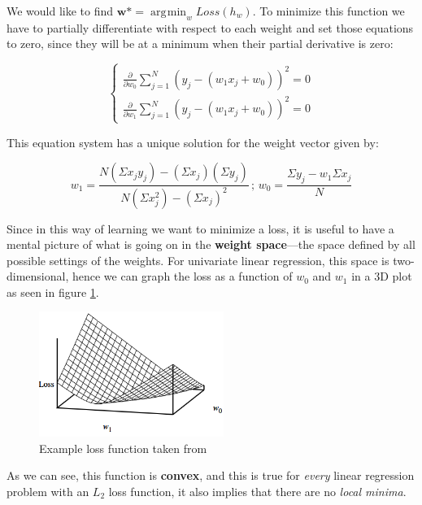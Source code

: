 \documentclass[10pt]{article}
\DeclareMathOperator*{\argmin}{\arg\!\min}
\begin{document}
We would like to find $\textbf{w*} = \argmin_{w} Loss(h_{w})$. To minimize this function we have to partially differentiate with respect to each weight and set those equations to zero, since they will be at a minimum when their partial derivative is zero: \par
\begin{equation*}
    \begin{cases}
        \frac{\partial}{\partial w_{0}} \sum_{j=1}^{N}(y_{j} - (w_{1}x_{j} + w_{0}))^{2} = 0 \\
        \frac{\partial}{\partial w_{1}} \sum_{j=1}^{N}(y_{j} - (w_{1}x_{j} + w_{0}))^{2} = 0
    \end{cases} 
\end{equation*}

This equation system has a unique solution for the weight vector given by: \par
\begin{equation*}
    w_{1} = \frac{N(\Sigma x_{j}y_{j}) - (\Sigma x_{j})(\Sigma y_{j})}{N(\Sigma x_{j}^{2}) - (\Sigma x_{j})^2} \,;\, w_{0} = \frac{\Sigma y_{j} - w_{1}\Sigma x_{j}}{N}
\end{equation*}

Since in this way of learning we want to minimize a loss, it is useful to have a mental picture of what is going on in the \textbf{weight space}---the space defined by all possible settings of the weights. For univariate linear regression, this space is two-dimensional, hence we can graph the loss as a function of $w_{0}$ and $w_{1}$ in a 3D plot as seen in figure \ref{fig:loss_function}. \par

\newpage

\begin{figure}[h]
    \centering
    \includegraphics[width=60mm]{2025-03-26-09-24-32.png}
    \caption{Example loss function taken from \cite{ai}}
    \label{fig:loss_function}
\end{figure}

As we can see, this function is \textbf{convex}, and this is true for \textit{every} linear regression problem with an $L_{2}$ loss function, it also implies that there are no \textit{local minima}. \cite{ai} \par
\end{document}
